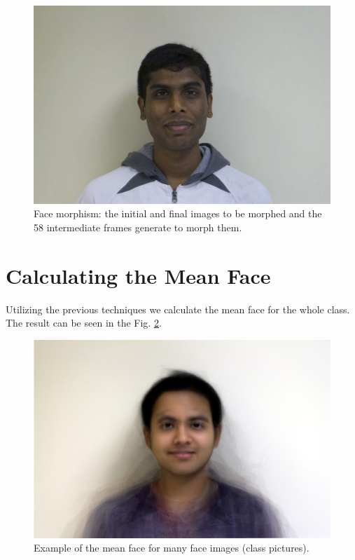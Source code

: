 \documentclass[11pt]{article}
\begin{document}
\begin{figure}[H]
\begin{center}
\includegraphics[scale=0.06]{figs/frames/morph_steinkirch_tangatur_61.jpg} 


\caption{Face morphism: the initial and final images to be morphed and the 58 intermediate frames generate to morph them.}
\label{frames}
\end{center}
\end{figure}



\newpage

	
\section{Calculating the Mean Face}

Utilizing the previous techniques we calculate the mean face for the whole class. The result can be seen in the Fig. \ref{mean}.

\quad

\begin{figure}[H]
\begin{center}
\includegraphics[scale=0.4]{figs/mean.jpg}  
\caption{Example of the mean face for many face images (class pictures).}
\label{mean}
\end{center}
\end{figure}
\end{document}
